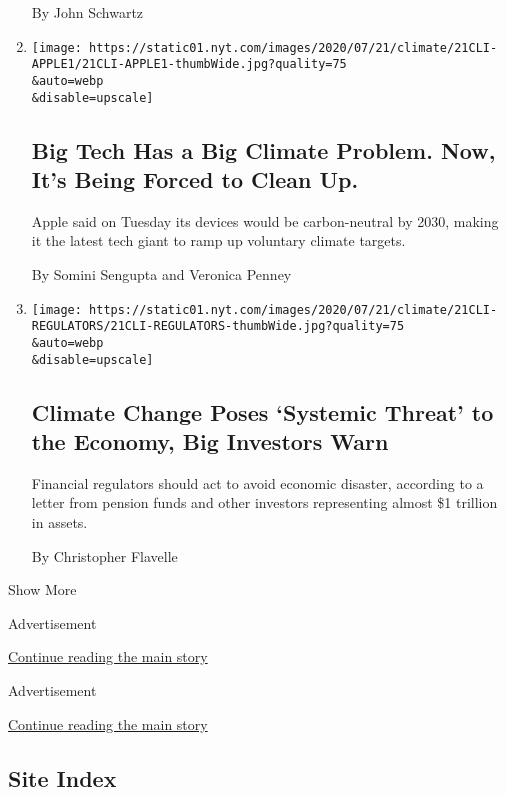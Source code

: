 \begin{enumerate}
  By John Schwartz
\item
  \href{/2020/07/21/climate/apple-emissions-pledge.html}{}

  \texttt{[image: https://static01.nyt.com/images/2020/07/21/climate/21CLI-APPLE1/21CLI-APPLE1-thumbWide.jpg?quality=75\\\&auto=webp\\\&disable=upscale]}

  \hypertarget{big-tech-has-a-big-climate-problem-now-its-being-forced-to-clean-up}{%
  \subsection{Big Tech Has a Big Climate Problem. Now, It's Being Forced
  to Clean
  Up.}\label{big-tech-has-a-big-climate-problem-now-its-being-forced-to-clean-up}}

  Apple said on Tuesday its devices would be carbon-neutral by 2030,
  making it the latest tech giant to ramp up voluntary climate targets.

  By Somini Sengupta and Veronica Penney
\item
  \href{/2020/07/21/climate/investors-climate-threat-regulators.html}{}

  \texttt{[image: https://static01.nyt.com/images/2020/07/21/climate/21CLI-REGULATORS/21CLI-REGULATORS-thumbWide.jpg?quality=75\\\&auto=webp\\\&disable=upscale]}

  \hypertarget{climate-change-poses-systemic-threat-to-the-economy-big-investors-warn}{%
  \subsection{Climate Change Poses `Systemic Threat' to the Economy, Big
  Investors
  Warn}\label{climate-change-poses-systemic-threat-to-the-economy-big-investors-warn}}

  Financial regulators should act to avoid economic disaster, according
  to a letter from pension funds and other investors representing almost
  \$1 trillion in assets.

  By Christopher Flavelle
\end{enumerate}

Show More

Advertisement

\protect\hyperlink{after-mid1}{Continue reading the main story}

Advertisement

\protect\hyperlink{after-mktg}{Continue reading the main story}

\hypertarget{site-index}{%
\subsection{Site Index}\label{site-index}}

